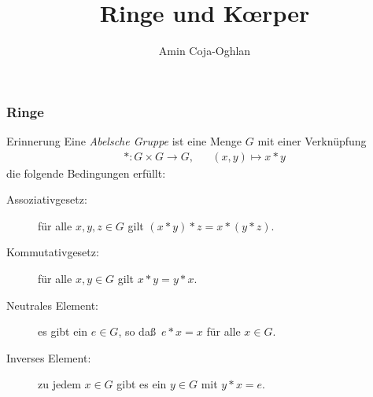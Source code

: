 \documentclass{beamer}
\title[Linadi]{Ringe und K\oe rper}
\author[Amin Coja-Oghlan]{Amin Coja-Oghlan}
\institute[Frankfurt]{JWGUFFM}
\date{}
\renewcommand{\emph}[1]{{\textcolor{solarizedRed}{\itshape #1}}}
\newcommand{\ue}{\"u}
\begin{document}
\frame[plain]{\titlepage}

\begin{frame}\frametitle{Ringe}
	\begin{block}{Erinnerung}
		Eine \emph{Abelsche Gruppe} ist eine Menge $G$ mit einer Verkn\ue pfung 
		\begin{align*}
			*:G\times G\to G,&&(x,y)\mapsto x*y
		\end{align*}
 die folgende Bedingungen erf\"ullt:
		\begin{description}
			\item[Assoziativgesetz:] f\ue r alle $x,y,z\in G$ gilt $(x*y)*z=x*(y*z).$
			\item[Kommutativgesetz:] f\ue r alle $x,y\in G$ gilt $x*y=y*x.$
			\item[Neutrales Element:] es gibt ein $e\in G$, so da\ss\  $e*x=x$ f\ue r alle $x\in G$.
			\item[Inverses Element:] zu jedem $x\in G$ gibt es ein $y\in G$ mit $y*x=e.$
		\end{description}
	\end{block}
\end{frame}
\end{document}

